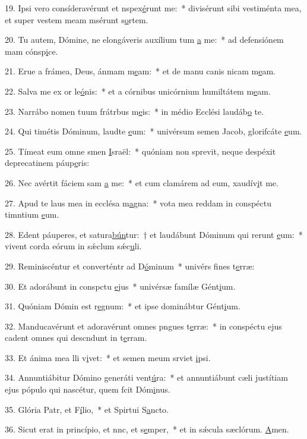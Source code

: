 19. Ipsi vero consíderavérunt et nspex\uline{é}runt me:~* divisérunt sibi vestiménta mea, et super vestem meam msérunt s\uline{o}rtem.\par 
20. Tu autem, Dómine, ne elongáveris auxílium tum \uline{a} me:~* ad defensiónem mam cónsp\uline{i}ce.\par 
21. Erue a frámea, Deus, ánmam m\uline{e}am:~* et de manu canis nicam m\uline{e}am.\par 
22. Salva me ex or le\uline{ó}nis:~* et a córnibus unicórnium humiltátem m\uline{e}am.\par 
23. Narrábo nomen tuum frátrbus m\uline{e}is:~* in médio Ecclési laudáb\uline{o} te.\par 
24. Qui timétis Dóminum, laudte \uline{e}um:~* univérsum semen Jacob, glorifcáte \uline{e}um.\par 
25. Tímeat eum omne smen \uline{I}sraël:~* quóniam non sprevit, neque despéxit deprecatinem páup\uline{e}ris:\par 
26. Nec avértit fáciem sam \uline{a} me:~* et cum clamárem ad eum, xaudív\uline{i}t me.\par 
27. Apud te laus mea in ecclésa m\uline{a}gna:~* vota mea reddam in conspéctu timntium \uline{e}um.\par 
28. Edent páuperes, et satura\uline{bún}tur:~† et laudábunt Dóminum qui rerunt \uline{e}um:~* vivent corda eórum in sǽclum sǽc\uline{u}li.\par 
29. Reminiscéntur et converténtr ad D\uline{ó}minum~* univérs fines t\uline{e}rræ:\par 
30. Et adorábunt in conspctu \uline{e}jus~* univérsæ famílæ Gént\uline{i}um.\par 
31. Quóniam Dómin est r\uline{e}gnum:~* et ipse dominábtur Gént\uline{i}um.\par 
32. Manducavérunt et adoravérunt omnes pngues t\uline{e}rræ:~* in conspéctu ejus cadent omnes qui descndunt in t\uline{e}rram.\par 
33. Et ánima mea lli v\uline{i}vet:~* et semen meum srviet \uline{i}psi.\par 
34. Annuntiábitur Dómino generáti vent\uline{ú}ra:~* et annuntiábunt cæli justítiam ejus pópulo qui nascétur, quem fcit Dóm\uline{i}nus.\par 
35. Glória Patr, et F\uline{í}lio,~* et Spirtui S\uline{a}ncto.\par 
36. Sicut erat in princípio, et nnc, et s\uline{e}mper,~* et in sǽcula sæclórum. \uline{A}men.\par 
